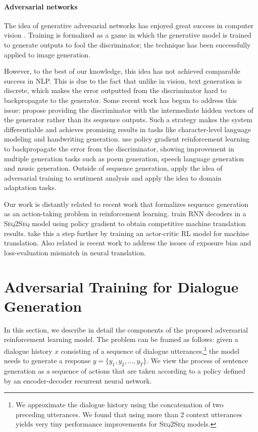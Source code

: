\documentclass[11pt]{article}
\newcommand{\sts}{{{\textsc{Seq2Seq}}}\xspace}
\begin{document}
\paragraph{Adversarial networks} 
The idea of generative adversarial networks has enjoyed great success in computer vision \cite{radford2015unsupervised,chen2016infogan,salimans2016improved}. 
Training is formalized as a game in which the generative model is trained to generate outputs to fool the discriminator; the technique has been successfully applied to image generation.

However, to the best of our knowledge, this idea has not achieved comparable success in NLP. 
This is due to the fact that unlike in vision, text generation is discrete, which makes the error
outputted
 from the discriminator hard to backpropagate to the generator. 
Some recent work has begun to address this issue:
 propose providing the discriminator with the intermediate hidden vectors of the generator rather than its sequence outputs. Such a strategy  makes the system differentiable and achieves promising results in tasks like character-level language modeling and handwriting generation. 
  use policy gradient reinforcement learning to backpropagate the error from the discriminator, showing improvement in multiple generation tasks such as poem generation,  speech language generation
and music generation. 
Outside of sequence generation,
 apply the idea of adversarial training to sentiment analysis and  apply the idea to domain adaptation tasks. 


 Our work is distantly related to recent work that formalizes sequence generation as an action-taking problem in reinforcement learning. 
 train RNN decoders in a \sts model using policy gradient
to obtain competitive machine translation results.
 take this a step further by training an actor-critic RL model for machine translation.
Also related is recent work \cite{shen2015minimum,wiseman2016sequence} to address the  issues of exposure bias and
loss-evaluation mismatch in neural translation. 
 

\section{Adversarial Training for Dialogue Generation}
In this section, we describe in detail the components of the proposed adversarial reinforcement learning model. 
The problem can be framed as follows: given a dialogue history $x$ consisting of a sequence of dialogue utterances,\footnote{We approximate the dialogue history using the concatenation of two preceding utterances. We found that using more than 2 context utterances yields very tiny performance improvements for \sts models.} the model needs to generate a response $y=\{y_1,y_2,...,y_T\}$.
 We view the 
 process of sentence generation 
   as a sequence of actions that are taken according to a policy defined by an
encoder-decoder recurrent neural network.
\end{document}
